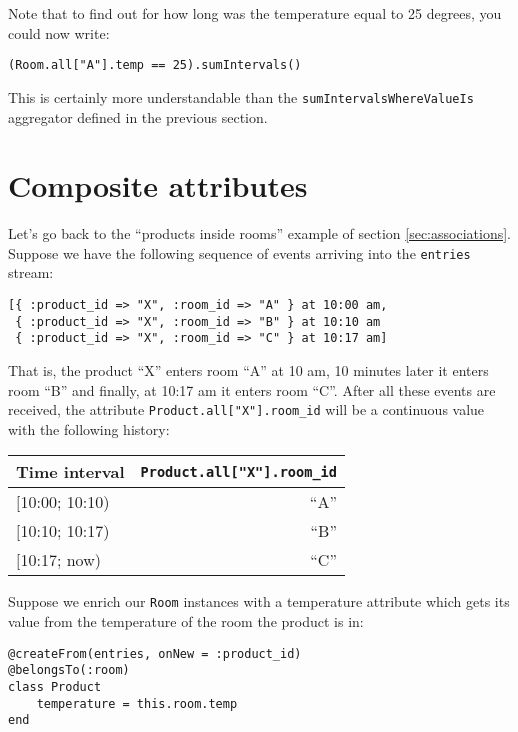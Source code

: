 \documentclass{report}
\begin{document}
Note that to find out for how long was the temperature equal to 25
degrees, you could now write:

\begin{verbatim}
(Room.all["A"].temp == 25).sumIntervals()
\end{verbatim}


This is certainly more understandable than the
\verb=sumIntervalsWhereValueIs= aggregator defined in the previous
section.

\section{Composite attributes}

Let's go back to the ``products inside rooms'' example of section
\ref{sec:associations}. Suppose we have the following sequence of
events arriving into the \verb=entries= stream:

\begin{verbatim}
[{ :product_id => "X", :room_id => "A" } at 10:00 am,
 { :product_id => "X", :room_id => "B" } at 10:10 am
 { :product_id => "X", :room_id => "C" } at 10:17 am]
\end{verbatim}

That is, the product ``X'' enters room ``A'' at 10 am, 10 minutes
later it enters room ``B'' and finally, at 10:17 am it enters room
``C''. After all these events are received, the attribute
\verb=Product.all["X"].room_id= will be a continuous value with the
following history:

\begin{tabular}{ |l|r| }
  \hline
  Time interval & \verb=Product.all["X"].room_id= \\
  \hline
  $[$10:00; 10:10) & ``A'' \\
  $[$10:10; 10:17) & ``B'' \\
  $[$10:17;   now) & ``C'' \\
  \hline
\end{tabular}

Suppose we enrich our \verb=Room= instances with a temperature
attribute which gets its value from the temperature of the room the
product is in:

\begin{verbatim}
@createFrom(entries, onNew = :product_id)
@belongsTo(:room)
class Product
    temperature = this.room.temp
end
\end{verbatim}
\end{document}
